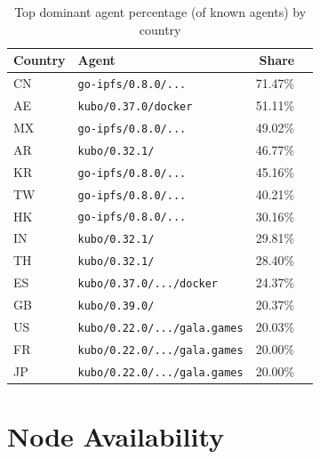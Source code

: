 \documentclass[10pt,a4paper,twocolumn]{article}
\begin{document}
\begin{table}[ht]
    \centering
    \caption{Top dominant agent percentage (of known agents) by country}
    \label{tab:agent-topshare-country}
    \begin{tabular}{llrr}
        \hline
        Country &  Agent & Share \\
        \hline
        CN & \texttt{go-ipfs/0.8.0/...} & 71.47\% \\
        AE & \texttt{kubo/0.37.0/docker} & 51.11\% \\
        MX & \texttt{go-ipfs/0.8.0/...} & 49.02\% \\
        AR & \texttt{kubo/0.32.1/} & 46.77\% \\
        KR & \texttt{go-ipfs/0.8.0/...} & 45.16\% \\
        TW & \texttt{go-ipfs/0.8.0/...} & 40.21\% \\
        HK & \texttt{go-ipfs/0.8.0/...} & 30.16\% \\
        IN & \texttt{kubo/0.32.1/} & 29.81\% \\
        TH & \texttt{kubo/0.32.1/} & 28.40\% \\
        ES & \texttt{kubo/0.37.0/.../docker} & 24.37\% \\
        GB & \texttt{kubo/0.39.0/} & 20.37\% \\
        US & \texttt{kubo/0.22.0/.../gala.games} & 20.03\% \\
        FR & \texttt{kubo/0.22.0/.../gala.games} & 20.00\% \\
        JP & \texttt{kubo/0.22.0/.../gala.games} & 20.00\% \\
        \hline
    \end{tabular}
\end{table}

\section{Node Availability}
\label{sec:available-nodes}
\end{document}
